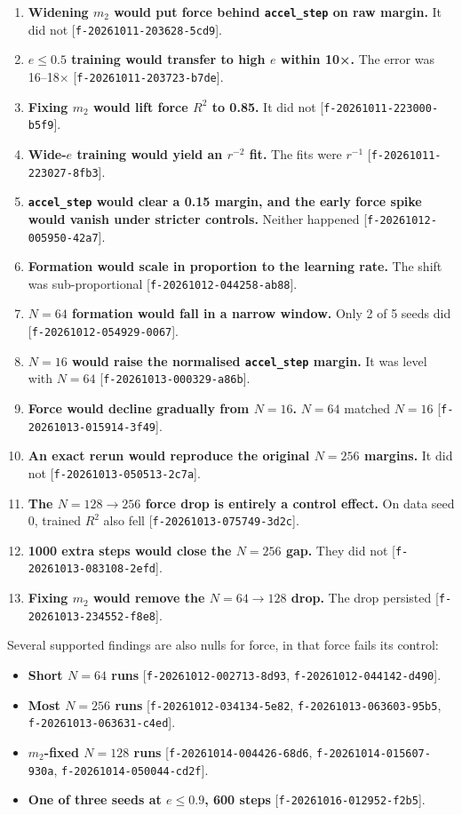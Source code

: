 \documentclass{article}
\begin{document}
\begin{enumerate}
\item \textbf{Widening $m_2$ would put force behind \texttt{accel\_step} on raw margin.} It did not [\texttt{f-20261011-203628-5cd9}].
\item \textbf{$e \le 0.5$ training would transfer to high $e$ within 10×.} The error was 16–18× [\texttt{f-20261011-203723-b7de}].
\item \textbf{Fixing $m_2$ would lift force $R^2$ to 0.85.} It did not [\texttt{f-20261011-223000-b5f9}].
\item \textbf{Wide-$e$ training would yield an $r^{-2}$ fit.} The fits were $r^{-1}$ [\texttt{f-20261011-223027-8fb3}].
\item \textbf{\texttt{accel\_step} would clear a 0.15 margin, and the early force spike would vanish under stricter controls.} Neither happened [\texttt{f-20261012-005950-42a7}].
\item \textbf{Formation would scale in proportion to the learning rate.} The shift was sub-proportional [\texttt{f-20261012-044258-ab88}].
\item \textbf{$N = 64$ formation would fall in a narrow window.} Only 2 of 5 seeds did [\texttt{f-20261012-054929-0067}].
\item \textbf{$N = 16$ would raise the normalised \texttt{accel\_step} margin.} It was level with $N = 64$ [\texttt{f-20261013-000329-a86b}].
\item \textbf{Force would decline gradually from $N = 16$.} $N = 64$ matched $N = 16$ [\texttt{f-20261013-015914-3f49}].
\item \textbf{An exact rerun would reproduce the original $N = 256$ margins.} It did not [\texttt{f-20261013-050513-2c7a}].
\item \textbf{The $N = 128 \to 256$ force drop is entirely a control effect.} On data seed 0, trained $R^2$ also fell [\texttt{f-20261013-075749-3d2c}].
\item \textbf{1000 extra steps would close the $N = 256$ gap.} They did not [\texttt{f-20261013-083108-2efd}].
\item \textbf{Fixing $m_2$ would remove the $N = 64 \to 128$ drop.} The drop persisted [\texttt{f-20261013-234552-f8e8}].
\end{enumerate}

Several supported findings are also nulls for force, in that force fails its control:

\begin{itemize}
\item \textbf{Short $N = 64$ runs} [\texttt{f-20261012-002713-8d93}, \texttt{f-20261012-044142-d490}].
\item \textbf{Most $N = 256$ runs} [\texttt{f-20261012-034134-5e82}, \texttt{f-20261013-063603-95b5}, \texttt{f-20261013-063631-c4ed}].
\item \textbf{$m_2$-fixed $N = 128$ runs} [\texttt{f-20261014-004426-68d6}, \texttt{f-20261014-015607-930a}, \texttt{f-20261014-050044-cd2f}].
\item \textbf{One of three seeds at $e \le 0.9$, 600 steps} [\texttt{f-20261016-012952-f2b5}].
\end{itemize}
\end{document}
